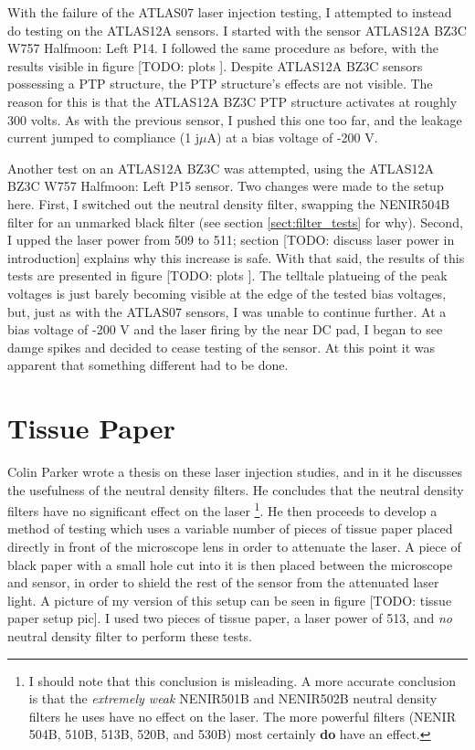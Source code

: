 \documentclass{report}
\begin{document}
            With the failure of the ATLAS07 laser injection testing, I attempted to instead do testing on the ATLAS12A sensors. I started with the sensor ATLAS12A BZ3C W757 Halfmoon: Left P14. I followed the same procedure as before, with the results visible in figure [TODO: plots
            ]. Despite ATLAS12A BZ3C sensors possessing a PTP structure, the PTP structure's effects are not visible. The reason for this is that the ATLAS12A BZ3C PTP structure activates at roughly 300 volts. As with the previous sensor, I pushed this one too far, and the leakage current jumped to compliance (1 j$\mu$A) at a bias voltage of -200 V.

            Another test on an ATLAS12A BZ3C was attempted, using the ATLAS12A BZ3C W757 Halfmoon: Left P15 sensor. Two changes were made to the setup here. First, I switched out the neutral density filter, swapping the NENIR504B filter for an unmarked \label{page:504_to_black_filter} black filter (see section \ref{sect:filter_tests} for why). Second, I upped the laser power from 509 to 511; section [TODO: discuss laser power in introduction] explains why this increase is safe. With that said, the results of this tests are presented in figure [TODO: plots
            ]. The telltale platueing of the peak voltages is just barely becoming visible at the edge of the tested bias voltages, but, just as with the ATLAS07 sensors, I was unable to continue further. At a bias voltage of -200 V and the laser firing by the near DC pad, I began to see damge spikes and decided to cease testing of the sensor. At this point it was apparent that something different had to be done.
            

        \section{Tissue Paper}
            Colin Parker wrote a thesis on these laser injection studies, and in it he discusses the usefulness of the neutral density filters. He concludes that the neutral density filters have no significant effect on the laser \footnote{I should note that this conclusion is misleading. A more accurate conclusion is that the \textit{extremely weak} NENIR501B and NENIR502B neutral density filters he uses have no effect on the laser. The more powerful filters (NENIR 504B, 510B, 513B, 520B, and 530B) most certainly \textbf{do} have an effect.}. He then proceeds to develop a method of testing which uses a variable number of pieces of tissue paper placed directly in front of the microscope lens in order to attenuate the laser. A piece of black paper with a small hole cut into it is then placed between the microscope and sensor, in order to shield the rest of the sensor from the attenuated laser light. A picture of my version of this setup can be seen in figure [TODO: tissue paper setup pic]. I used two pieces of tissue paper, a laser power of 513, and \textit{no} neutral density filter to perform these tests.
\end{document}
